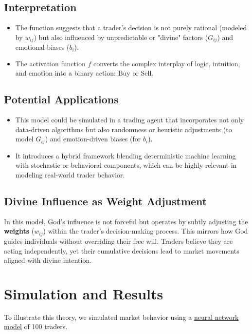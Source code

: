 \documentclass{article}
\begin{document}
\subsection{Interpretation}

\begin{itemize}
\item The function suggests that a trader's decision is not purely rational (modeled by $w_{ij}$) but also influenced by unpredictable or "divine" factors ($G_{ij}$) and emotional biases ($b_i$).  
\item  The activation function $ f $ converts the complex interplay of logic, intuition, and emotion into a binary action: Buy or Sell.
\end{itemize}

\subsection{Potential Applications}
\begin{itemize}
\item This model could be simulated in a trading agent that incorporates not only data-driven algorithms but also randomness or heuristic adjustments (to model $ G_{ij} $) and emotion-driven biases (for $b_i $).  
\item It introduces a hybrid framework blending deterministic machine learning with stochastic or behavioral components, which can be highly relevant in modeling real-world trader behavior.
\end{itemize}

\subsection{Divine Influence as Weight Adjustment}

In this model, God's influence is not forceful but operates by subtly adjusting the {\bf weights} ($w_{ij}$) within the trader's decision-making process. This mirrors how God guides individuals without overriding their free will. Traders believe they are acting independently, yet their cumulative decisions lead to market movements aligned with divine intention.



\section{Simulation and Results}

To illustrate this theory, we simulated market behavior using a 
\href{https://github.com/quantiota/Blog-Articles/blob/main/scripts/neural-network-model.py}{neural network model}
 of 100 traders.
\end{document}
